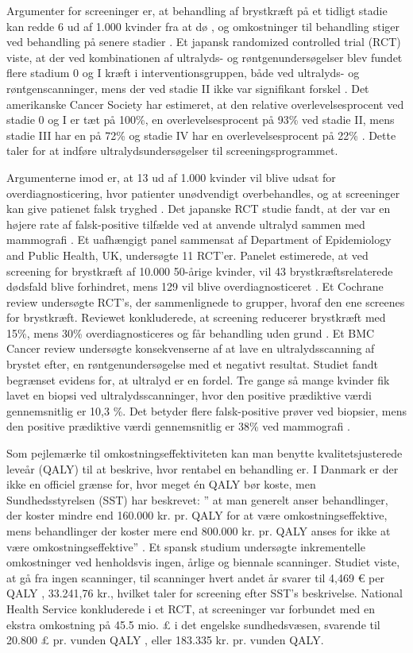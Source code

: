 Argumenter for screeninger er, at behandling af brystkræft på et tidligt stadie kan redde 6 ud af 1.000 kvinder fra at dø \cite{Argumenter}, og omkostninger til behandling stiger ved behandling på senere stadier \cite{StadieOmkostninger}. Et japansk randomized controlled trial (RCT) viste, at der ved kombinationen af ultralyds- og røntgenundersøgelser blev fundet flere stadium 0 og I kræft i interventionsgruppen, både ved ultralyds- og røntgenscanninger, mens der ved stadie II ikke var signifikant forskel \cite{Japan}. Det amerikanske Cancer Society har estimeret, at den relative overlevelsesprocent ved stadie 0 og I er tæt på 100\%, en overlevelsesprocent på 93\% ved stadie II, mens stadie III har en på 72\% og stadie IV har en overlevelsesprocent på 22\% \cite{CancerSociety}. Dette taler for at indføre ultralydsundersøgelser til screeningsprogrammet. 

Argumenterne imod er, at 13 ud af 1.000 kvinder vil blive udsat for overdiagnosticering, hvor patienter unødvendigt overbehandles, og at screeninger kan give patienet falsk tryghed \cite{Argumenter}. Det japanske RCT studie fandt, at der var en højere rate af falsk-positive tilfælde ved at anvende ultralyd sammen med mammografi \cite{Japan}. Et uafhængigt panel sammensat af Department of Epidemiology and Public Health, UK, undersøgte 11 RCT’er. Panelet estimerede, at ved screening for brystkræft af 10.000 50-årige kvinder, vil 43 brystkræftsrelaterede dødsfald blive forhindret, mens 129 vil blive overdiagnosticeret \cite{Panel}. Et Cochrane review undersøgte RCT’s, der sammenlignede to grupper, hvoraf den ene screenes for brystkræft. Reviewet konkluderede, at screening reducerer brystkræft med 15\%, mens 30\% overdiagnosticeres og får behandling uden grund \cite{Gotzche}. Et BMC Cancer review undersøgte konsekvenserne af at lave en ultralydsscanning af brystet efter, en røntgenundersøgelse med et negativt resultat. Studiet fandt begrænset evidens for, at ultralyd er en fordel. Tre gange så mange kvinder fik lavet en biopsi ved ultralydsscanninger, hvor den positive prædiktive værdi gennemsnitlig er 10,3 \%. Det betyder flere falsk-positive prøver ved biopsier, mens den positive prædiktive værdi gennemsnitlig er 38\% ved mammografi \cite{DenseBreast}. 

Som pejlemærke til omkostningseffektiviteten kan man benytte kvalitetsjusterede leveår (QALY) til at beskrive, hvor rentabel en behandling er. I Danmark er der ikke en officiel grænse for, hvor meget én QALY bør koste, men Sundhedsstyrelsen (SST) har beskrevet: ” at man generelt anser behandlinger, der koster mindre end 160.000 kr. pr. QALY for at være omkostningseffektive, mens behandlinger der koster mere end 800.000 kr. pr. QALY anses for ikke at være omkostningseffektive” \cite{QALY}. 
Et spansk studium undersøgte inkrementelle omkostninger ved henholdsvis ingen, årlige og biennale scanninger. Studiet viste, at gå fra ingen scanninger, til scanninger hvert andet år svarer til 4,469 € per QALY \cite{SpanskStudie}, 33.241,76 kr., hvilket taler for screening efter SST's beskrivelse. National Health Service konkluderede i et RCT, at screeninger var forbundet med en ekstra omkostning på 45.5 mio. £ i det engelske sundhedsvæsen, svarende til 20.800 £ pr. vunden QALY \cite{NHS}, eller 183.335 kr. pr. vunden QALY.  

